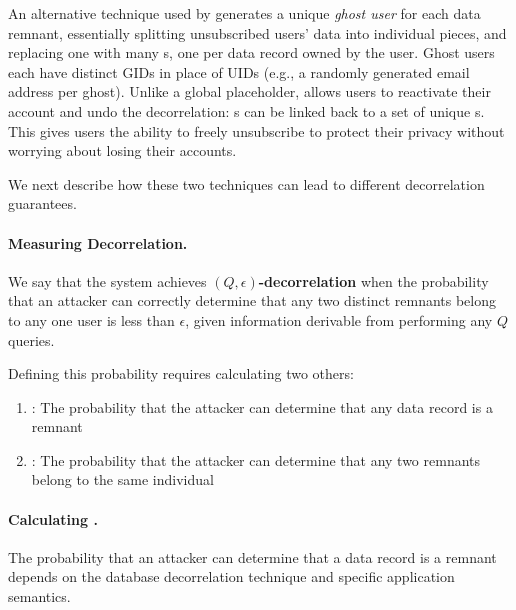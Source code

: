 An alternative technique used by \sys{} generates a unique \emph{ghost user} for each data remnant,
essentially splitting unsubscribed users' data into individual pieces, and replacing one
\uidkey{} with many \gidkey{}s, one per data record owned by the user. Ghost users each have
distinct GIDs in place of UIDs (e.g., a randomly generated email
address per ghost).  Unlike a global placeholder, \sys{} allows users to reactivate their account and
undo the decorrelation: \uidkey{}s can be linked back to a set of unique \gidkey{}s.
This gives users the ability to freely unsubscribe to protect their privacy without worrying about
losing their accounts.   

We next describe how these two techniques can lead to different decorrelation guarantees.

\paragraph{Measuring Decorrelation.} 
We say that the system achieves \textbf{$(Q, \epsilon)$-decorrelation} when the probability that an
attacker can correctly determine that any two distinct remnants belong to any one user is less than
$\epsilon$, given information derivable from performing any $Q$ queries.  

Defining this probability requires calculating two others: \begin{enumerate}
    \item[\premnant{}]: 
        The probability that the attacker can determine that any data record is a remnant
    \item[\plinked{}]:
        The probability that the attacker can determine that any two remnants belong to the same individual
\end{enumerate}


\paragraph{Calculating \premnant{}.}
The probability that an attacker can determine that a data record is a remnant depends on the
database decorrelation technique and specific application semantics.

